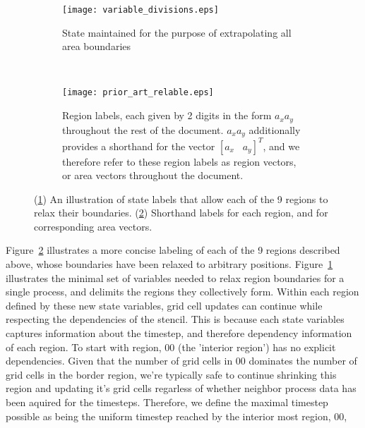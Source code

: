 \begin{figure}[t]
  \centering
  \begin{subfigure}[t]{.5\textwidth}
    \centering
    \texttt{[image: variable\_divisions.eps]}
    \caption{State maintained for the purpose of extrapolating all area boundaries}
    \label{fig:state_labels}
  \end{subfigure}
  ~
  \begin{subfigure}[t]{.4\textwidth}
    \centering
    \texttt{[image: prior\_art\_relable.eps]}
    \caption{Region labels, each given by 2 digits in the form $a_xa_y$ throughout the rest of the document.
    $a_xa_y$ additionally provides a shorthand for the vector $[a_x\;\;\; a_y]^T$, and we therefore refer to
    these region labels as region vectors, or area vectors throughout the document.}\label{fig:region_vectors}
    \end{subfigure}
  \caption{(\ref{fig:state_labels}) An illustration of state labels that allow each of the 9 regions to relax their
  boundaries.  (\ref{fig:region_vectors}) Shorthand labels for each region, and for corresponding area vectors.}
  \label{fig:local_decomposition}
\end{figure}

Figure~\ref{fig:region_vectors} illustrates a more concise labeling of
each of the 9 regions described above, whose boundaries have been relaxed to arbitrary positions.
  Figure~\ref{fig:state_labels} illustrates the minimal set of variables needed to relax region boundaries
for a single process, and delimits the regions they collectively form.
Within each region defined by these new state variables, grid cell updates can continue while respecting the
dependencies of the stencil.  This is because each state variables captures information about the timestep,
and therefore dependency information of each region.  To start with region, $00$ (the 'interior region')
has no explicit dependencies.  Given that the number of grid cells in $00$
dominates the number of grid cells in the border region, we're typically safe to continue shrinking this region
and updating it's grid cells regarless of whether neighbor process data has been aquired for the timesteps.
Therefore, we define the maximal timestep possible as being the uniform timestep reached by the interior most
region, $00$,

